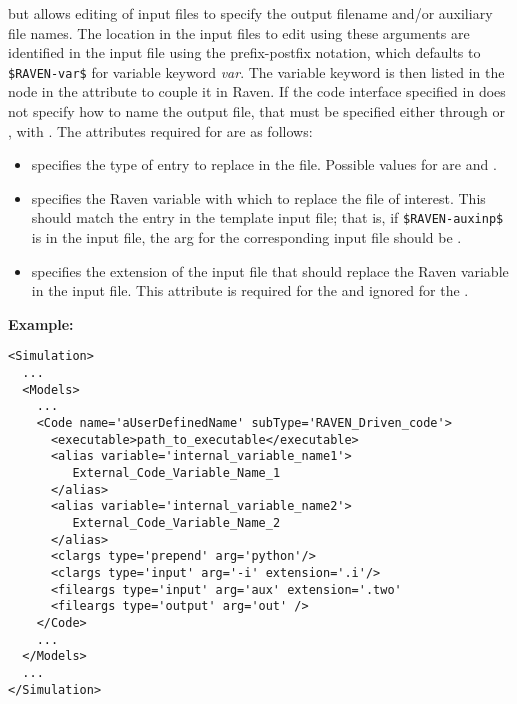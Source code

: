 \begin{itemize}
  but allows editing of input files to specify the output filename and/or auxiliary
  file names.
  The location in the input files to edit using these arguments are identified in
  the input file using the prefix-postfix notation, which defaults to
  \texttt{\$RAVEN-var\$} for variable keyword \emph{var}.  The variable keyword
  is then listed in the  node in the attribute  to
  couple it in Raven.
  If the code interface specified in  
  does not specify how to name the output file, that must be specified either through
   or , with  .
  The attributes required for  are as follows:
  \begin{itemize}
    \item {}  specifies the type
    of entry to replace in the file.  Possible values for 
     are  and .
    \item {}  specifies the Raven
    variable with which to replace the file of interest.  This should match
    the entry in the template input file; that is, if \texttt{\$RAVEN-auxinp\$}
    is in the input file, the arg for the corresponding input file should be
    .
    \item {}  specifies the
    extension of the input file that should replace the Raven variable in
    the input file.  This attribute is required for the  
    and ignored for the  .
  \end{itemize}
\end{itemize}
\textbf{Example:}
\begin{lstlisting}[style=XML,morekeywords={subType,name,variable}]
<Simulation>
  ...
  <Models>
    ...
    <Code name='aUserDefinedName' subType='RAVEN_Driven_code'>
      <executable>path_to_executable</executable>
      <alias variable='internal_variable_name1'>
         External_Code_Variable_Name_1
      </alias>
      <alias variable='internal_variable_name2'>
         External_Code_Variable_Name_2
      </alias>
      <clargs type='prepend' arg='python'/>
      <clargs type='input' arg='-i' extension='.i'/>
      <fileargs type='input' arg='aux' extension='.two'
      <fileargs type='output' arg='out' />
    </Code>
    ...
  </Models>
  ...
</Simulation>
\end{lstlisting}

